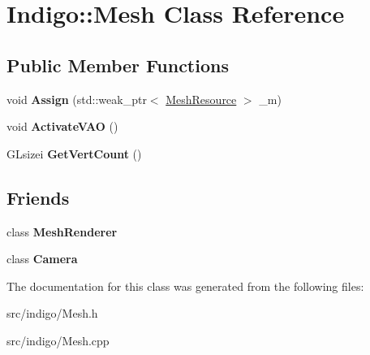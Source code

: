 \hypertarget{class_indigo_1_1_mesh}{}\section{Indigo\+:\+:Mesh Class Reference}
\label{class_indigo_1_1_mesh}
\subsection*{Public Member Functions}
\begin{DoxyCompactItemize}
\item 
\mbox{\label{class_indigo_1_1_mesh_a3bfaec6ece8be6d72bfec8e52569eb4c}} 
void {\bfseries Assign} (std\+::weak\+\_\+ptr$<$ \hyperlink{class_indigo_1_1_mesh_resource}{Mesh\+Resource} $>$ \+\_\+m)
\item 
\mbox{\label{class_indigo_1_1_mesh_a6765b1fb8374255348271380be90c7b4}} 
void {\bfseries Activate\+V\+AO} ()
\item 
\mbox{\label{class_indigo_1_1_mesh_a2f97799cffcd84274e24ffd177c6fd8e}} 
G\+Lsizei {\bfseries Get\+Vert\+Count} ()
\end{DoxyCompactItemize}
\subsection*{Friends}
\begin{DoxyCompactItemize}
\item 
\mbox{\label{class_indigo_1_1_mesh_aeba626af0b56820b14192cd581ebbf77}} 
class {\bfseries Mesh\+Renderer}
\item 
\mbox{\label{class_indigo_1_1_mesh_ad8bd9afbbd7af19d996da80e9d25890d}} 
class {\bfseries Camera}
\end{DoxyCompactItemize}


The documentation for this class was generated from the following files\+:\begin{DoxyCompactItemize}
\item 
src/indigo/Mesh.\+h\item 
src/indigo/Mesh.\+cpp\end{DoxyCompactItemize}
